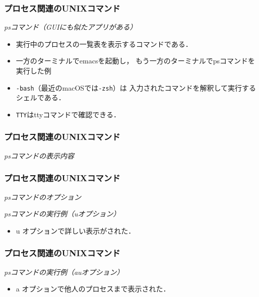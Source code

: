 \documentclass{beamer}                 %
\begin{document}
\begin{frame}[fragile]
  \frametitle{プロセス関連のUNIXコマンド}
  \emph{psコマンド（GUIにも似たアプリがある）}
  \begin{itemize}
  \item 実行中のプロセスの一覧表を表示するコマンドである．
  \item 一方のターミナルでemacsを起動し，
    もう一方のターミナルでpsコマンドを実行した例
  \item \texttt{-bash}（最近のmacOSでは\texttt{-zsh}）は
    入力されたコマンドを解釈して実行するシェルである．
  \item \texttt{TTY}はttyコマンドで確認できる．
  \end{itemize}
\end{frame}

\begin{frame}[fragile]
  \frametitle{プロセス関連のUNIXコマンド}
  \emph{psコマンドの表示内容}
\end{frame}

\begin{frame}[fragile]
  \frametitle{プロセス関連のUNIXコマンド}
  \emph{psコマンドのオプション}

  \emph{psコマンドの実行例（uオプション）}

  \begin{itemize}
  \item u オプションで詳しい表示がされた．
  \end{itemize}
\end{frame}

\begin{frame}[fragile]
  \frametitle{プロセス関連のUNIXコマンド}
  \emph{psコマンドの実行例（auオプション）}

  \begin{itemize}
  \item a オプションで他人のプロセスまで表示された．
  \end{itemize}
\end{frame}
\end{document}
